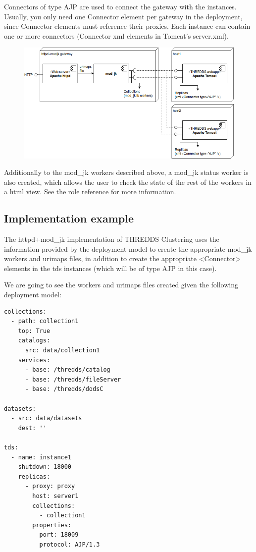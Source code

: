 \documentclass[a4paper,12pt]{article}
\begin{document}
Connectors of type AJP are used to connect the gateway with the instances. Usually, you only need one Connector element per gateway in the deployment, since Connector elements must reference their proxies. Each instance can contain one or more connectors (Connector xml elements in Tomcat's server.xml).

\begin{figure}[h]
\includegraphics[width=1\textwidth]{images/jk-gateway.png}
\end{figure}

Additionally to the mod\_jk workers described above, a mod\_jk status worker is also created, which allows the user to check the state of the rest of the workers in a html view. See the role reference for more information.

\subsection{Implementation example}

The httpd+mod\_jk implementation of THREDDS Clustering uses the information provided by the deployment model to create the appropriate mod\_jk workers and urimaps files, in addition to create the appropriate <Connector> elements in the tds instances (which will be of type AJP in this case).

We are going to see the workers and urimaps files created given the following deployment model:

\begin{lstlisting}
collections:
  - path: collection1 
    top: True 
    catalogs:
      src: data/collection1
    services: 
      - base: /thredds/catalog
      - base: /thredds/fileServer
      - base: /thredds/dodsC

datasets:
  - src: data/datasets
    dest: '' 

tds:
  - name: instance1
    shutdown: 18000
    replicas: 
      - proxy: proxy 
        host: server1
        collections: 
          - collection1
        properties: 
          port: 18009
          protocol: AJP/1.3
\end{lstlisting}
\end{document}
